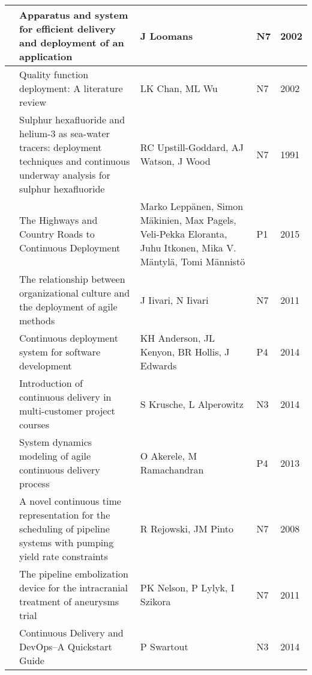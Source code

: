 \begin{landscape}
\begin{longtable}{|l|L{10cm}|L{10cm}|l|l|}
     & Apparatus and system for efficient delivery and deployment of an application & J Loomans & N7 & 2002 \\ \hline
    
     & Quality function deployment: A literature review & LK Chan, ML Wu & N7 & 2002 \\ \hline
    
     & Sulphur hexafluoride and helium-3 as sea-water tracers: deployment techniques and continuous underway analysis for sulphur hexafluoride
     & RC Upstill-Goddard, AJ Watson, J Wood & N7 & 1991 \\ \hline
    
     & The Highways and Country Roads to Continuous Deployment & Marko Leppänen, Simon Mäkinien, Max Pagels, Veli-Pekka Eloranta, Juhu Itkonen, Mika V. Mäntylä, Tomi Männistö & P1 & 2015\\ \hline
    
     & The relationship between organizational culture and the deployment of agile methods & J Iivari, N Iivari  & N7 & 2011 \\ \hline
    
     & Continuous deployment system for software development
     & KH Anderson, JL Kenyon, BR Hollis, J Edwards & P4 & 2014 \\ \hline
    
      & Introduction of continuous delivery in multi-customer project courses
     & S Krusche, L Alperowitz & N3 & 2014 \\ \hline
    
     & System dynamics modeling of agile continuous delivery process
     & O Akerele, M Ramachandran & P4 & 2013 \\ \hline
    
     & A novel continuous time representation for the scheduling of pipeline systems with pumping yield rate constraints & R Rejowski, JM Pinto & N7 & 2008 \\ \hline
    
     & The pipeline embolization device for the intracranial treatment of aneurysms trial & PK Nelson, P Lylyk, I Szikora & N7 & 2011 \\ \hline
    
      & Continuous Delivery and DevOps–A Quickstart Guide & P Swartout & N3 & 2014 \\ \hline
    

\end{longtable}
\end{landscape}
